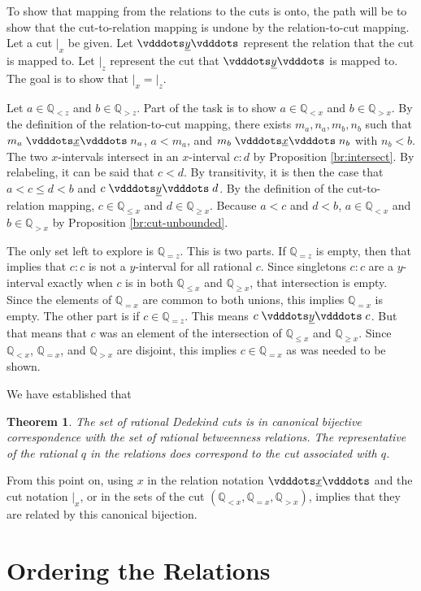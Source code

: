 \documentclass[12pt]{article}
\newtheorem{theorem}{Theorem}[section]
\newcommand{\qcut}[2][x]{\ensuremath{\mathbb{Q}_{#2 #1}}}
\newcommand{\qlt}[1][x]{\qcut[#1]{<}}
\newcommand{\qeq}[1][x]{\qcut[#1]{=}}
\newcommand{\qgt}[1][x]{\qcut[#1]{>}}
\newcommand{\qgeq}[1][x]{\qcut[#1]{\geq}}
\newcommand{\qleq}[1][x]{\qcut[#1]{\leq}}
\newcommand{\cut}[1][x]{{\vert}_{#1} }
\newcommand{\yrel}{\xrel[y]}
\begin{document}
To show that mapping from the relations to the cuts is onto, the path will be to show that the cut-to-relation mapping is undone by the relation-to-cut mapping. Let a cut $\cut$ be given. Let $\yrel$ represent the relation that the cut is mapped to. Let $\cut[z]$ represent the cut that $\yrel$ is mapped to. The goal is to show that $\cut = \cut[z]$.  

Let $a \in \qlt[z]$ and $b \in \qgt[z]$. Part of the task is to show $a \in \qlt$ and $b \in \qgt$. By the definition of the relation-to-cut mapping, there exists $m_a, n_a, m_b, n_b$ such that $m_a \xrel n_a$, $a < m_a$, and $m_b \xrel n_b$ with $n_b < b$. The two $x$-intervals intersect in an $x$-interval $c:d$ by  Proposition \ref{br:intersect}. By relabeling, it can be said that $c < d$. By transitivity, it is then the case that $a < c \leq d < b$ and $c \yrel d$. By the definition of the cut-to-relation mapping, $c \in \qleq$ and $d \in \qgeq$. Because $a < c$ and $ d < b$, $a \in \qlt$ and $b \in \qgt$ by Proposition \ref{br:cut-unbounded}.

The only set left to explore is $\qeq[z]$. This is two parts. If $\qeq[z]$ is empty, then that implies that $c:c$ is not a $y$-interval for all rational $c$. Since singletons $c:c$ are a $y$-interval exactly when $c$ is in both $\qleq$ and $\qgeq$, that intersection is empty. Since the elements of $\qeq$ are common to both unions, this implies $\qeq$ is empty. The other part is if $c \in \qeq[z]$. This means $c \yrel c$. But that means that $c$ was an element of the intersection of $\qleq$ and $\qgeq$. Since $\qlt$, $\qeq$, and $\qgt$ are disjoint, this implies $c \in \qeq$ as was needed to be shown. 


We have established that
\begin{theorem}
    The set of rational Dedekind cuts is in canonical bijective correspondence with the set of rational betweenness relations. The representative of the rational $q$ in the relations does correspond to the cut associated with $q$.
\end{theorem}

From this point on, using $x$ in the relation notation $\xrel$ and the cut notation $\cut$, or in the sets of the cut $(\qlt, \qeq, \qgt)$, implies that they are related by this canonical bijection. 

\section{Ordering the Relations}
\end{document}

